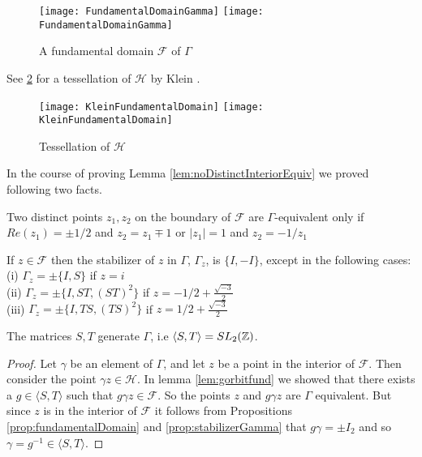 \begin{figure}[!htbp]
  \begin{center}
    \leavevmode
    \ifpdf
      \texttt{[image: FundamentalDomainGamma]}
    \else
      \texttt{[image: FundamentalDomainGamma]}
    \fi
    \caption{A fundamental domain $\mathcal{F}$ of $\Gamma$}
    \label{fig:fundDomainGamma}
  \end{center}
\end{figure}


See \ref{fig:kleinTessellation} for a tessellation of $\mathcal{H}$ by Klein \citep{klein}.

\begin{figure}[!htbp]
  \begin{center}
    \leavevmode
    \ifpdf
      \texttt{[image: KleinFundamentalDomain]}
    \else
      \texttt{[image: KleinFundamentalDomain]}
    \fi
    \caption{Tessellation of $\mathcal{H}$}
    \label{fig:kleinTessellation}
  \end{center}
\end{figure}


In the course of proving Lemma \ref{lem:noDistinctInteriorEquiv} we proved following two facts.
\begin{proposition}\label{prop:gammaEquivBoundary}
Two distinct points $z_1,z_2$ on the boundary of $\mathcal{F}$ are $\Gamma$-equivalent only if $Re(z_1) = \pm 1/2$ and $z_2 = z_1 \mp 1$ or $|z_1| =1$ and $z_2 = -1/{z_1}$
\end{proposition}

\begin{proposition}\label{prop:stabilizerGamma}
If $z \in \mathcal{F}$ then the stabilizer of $z$ in $\Gamma$, $\Gamma_z$, is $\{I,-I\}$, except in the following cases: \\
(i)   $\Gamma_z= \pm \{I,S\}$ if $z=i$\\
(ii)  $\Gamma_z= \pm \{I,ST, {(ST)}^2\}$ if $z=-1/2 + \frac{\sqrt{-3}}{2}$\\
(iii) $\Gamma_z= \pm \{I,TS, {(TS)}^2\}$ if $z=1/2 + \frac{\sqrt{-3}}{2}$\\
\end{proposition}


\begin{theorem}\label{thm:STGenerateSLTZGeometric}
The matrices $S,T$ generate $\Gamma$, i.e $\langle S, T \rangle =SL_2(\mathbb{Z})$.
\end{theorem}
\begin{proof}
Let $\gamma$ be an element of $\Gamma$, and let $z$ be a point in the interior of $\mathcal{F}$. Then consider the point $\gamma z \in \mathcal{H}$. In lemma \ref{lem:gorbitfund} we showed that there exists a $g \in \langle S, T \rangle$ such that $g \gamma z \in \mathcal{F}$. So the points $z$ and $g\gamma z$ are $\Gamma$ equivalent. 
But since $z$ is in the interior of $\mathcal{F}$ it follows from Propositions \ref{prop:fundamentalDomain} and \ref{prop:stabilizerGamma} that $g \gamma = \pm I_2$ and so $\gamma = g^{-1} \in \langle S, T \rangle$.
\end{proof}

